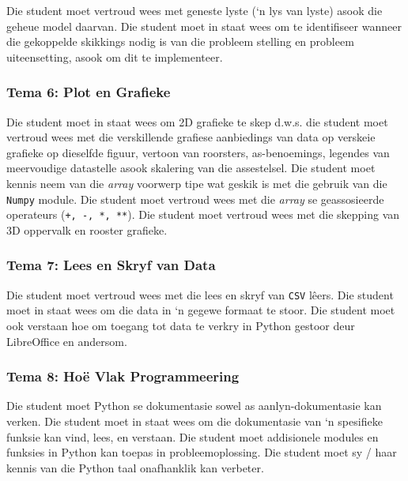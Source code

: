             Die student moet vertroud wees met geneste lyste (`n lys van lyste)
            asook die geheue model daarvan.  Die student moet in staat wees om
            te identifiseer wanneer die gekoppelde skikkings nodig is van die
            probleem stelling en probleem uiteensetting, asook om dit te
            implementeer.

        \subsubsection{Tema 6: Plot en Grafieke}
            Die student moet in staat wees om 2D grafieke te skep d.w.s. die
            student moet vertroud wees met die verskillende grafiese
            aanbiedings van data op verskeie grafieke op dieselfde figuur,
            vertoon van roorsters, as-benoemings, legendes van meervoudige
            datastelle asook skalering van die assestelsel. Die student moet
            kennis neem van die \textit{array} voorwerp tipe wat geskik is met
            die gebruik van die \texttt{Numpy} module. Die student moet
            vertroud wees met die \textit{array} se geassosieerde operateurs
            (\texttt {+, -, *, **}). Die student moet vertroud wees met die
            skepping van 3D oppervalk en rooster grafieke.

        \subsubsection{Tema 7: Lees en Skryf van Data}
            Die student moet vertroud wees met die lees en skryf van
            \texttt{CSV} l\^eers. Die student moet in staat wees om die data
            in `n gegewe formaat te stoor. Die student moet ook verstaan hoe om
            toegang tot data te verkry in Python gestoor deur LibreOffice en
            andersom.

        \subsubsection{Tema 8: Ho\"e Vlak Programmeering}
            Die student moet Python se dokumentasie sowel as
            aanlyn-dokumentasie kan verken. Die student moet in staat wees om
            die dokumentasie van `n spesifieke funksie kan vind, lees, en
            verstaan. Die student moet addisionele modules en funksies in
            Python kan toepas in probleemoplossing. Die student moet sy / haar
            kennis van die Python taal onafhanklik kan verbeter.

